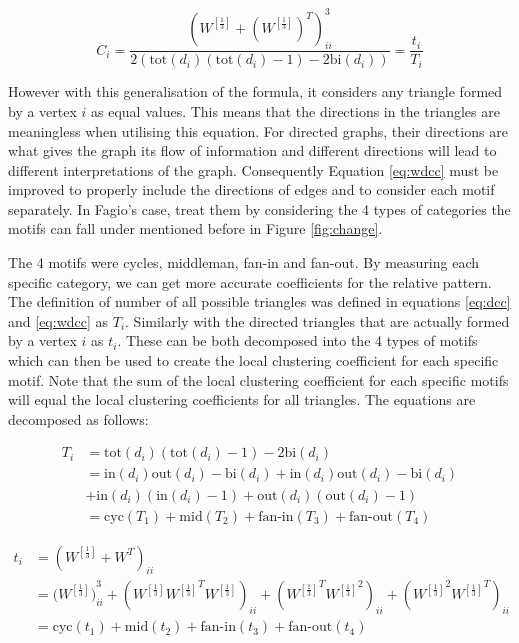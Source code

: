 \begin{equation} \label{eq:wdcc}
C_i = \frac{(W^{[\frac{1}{3}]} + (W^{[\frac{1}{3}]})^T)^3_{ii}}{2(\text{tot}(d_i)(\text{tot}(d_i) - 1) - 2\text{bi}(d_i))} = \frac{t_i}{T_i}
\end{equation}

However with this generalisation of the formula, it considers any triangle formed by a vertex $i$ as equal values. This means that the directions in the triangles are meaningless when utilising this equation. For directed graphs, their directions are what gives the graph its flow of information and different directions will lead to different interpretations of the graph. Consequently Equation \ref{eq:wdcc} must be improved to properly include the directions of edges and to consider each motif separately. In Fagio's case, treat them by considering the 4 types of categories the motifs can fall under mentioned before in Figure \ref{fig:change}. 

The 4 motifs were cycles, middleman, fan-in and fan-out. By measuring each specific category, we can get more accurate coefficients for the relative pattern. The definition of number of all possible triangles was defined in equations \ref{eq:dcc} and \ref{eq:wdcc} as $T_i$. Similarly with the directed triangles that are actually formed by a vertex $i$ as $t_i$. These can be both decomposed into the 4 types of motifs which can then be used to create the local clustering coefficient for each specific motif. Note that the sum of the local clustering coefficient for each specific motifs will equal the local clustering coefficients for all triangles. The equations are decomposed as follows:

\begin{align}
T_i &= \text{tot}(d_i)(\text{tot}(d_i) - 1) - 2\text{bi}(d_i) \\
&= \text{in}(d_i)\text{out}(d_i) - \text{bi}(d_i) + \text{in}(d_i)\text{out}(d_i) - \text{bi}(d_i) \nonumber \\
&+ \text{in}(d_i)(\text{in}(d_i) - 1) + \text{out}(d_i)(\text{out}(d_i) - 1) \nonumber \\ 
&= \text{cyc}(T_1) + \text{mid}(T_2) + \text{fan-in}(T_3) + \text{fan-out}(T_4) \nonumber
\end{align}

\begin{align}
t_i &= (W^{[\frac{1}{3}]} + W^T)_{ii} \\
&= ({W^{[\frac{1}{3}]})}^3_{ii} + (W^{[\frac{1}{3}]}{W^{[\frac{1}{3}]}}^TW^{[\frac{1}{3}]})_{ii} + ({W^{[\frac{1}{3}]}}^T{W^{[\frac{1}{3}]}}^2)_{ii} + ({W^{[\frac{1}{3}]}}^2{W^{[\frac{1}{3}]}}^T)_{ii} \nonumber \\ 
&= \text{cyc}(t_1) + \text{mid}(t_2) + \text{fan-in}(t_3) + \text{fan-out}(t_4) \nonumber
\end{align}
 
